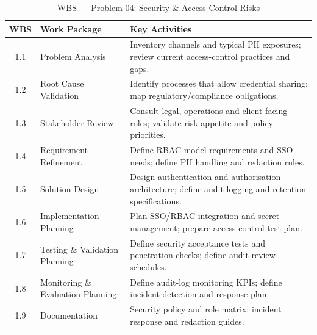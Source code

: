 \documentclass[12pt,a4paper]{report}
\begin{document}
\begin{table}[H]
\centering
\renewcommand{\arraystretch}{1.25}
\small
\begin{tabularx}{\textwidth}{|c|p{4.2cm}|X|}
\hline
\rowcolor{secondary}
\textbf{WBS} & \textbf{Work Package} & \textbf{Key Activities} \\
\hline
1.1 & Problem Analysis & Inventory channels and typical PII exposures; review current access-control practices and gaps. \\
\hline
1.2 & Root Cause Validation & Identify processes that allow credential sharing; map regulatory/compliance obligations. \\
\hline
1.3 & Stakeholder Review & Consult legal, operations and client-facing roles; validate risk appetite and policy priorities. \\
\hline
1.4 & Requirement Refinement & Define RBAC model requirements and SSO needs; define PII handling and redaction rules. \\
\hline
1.5 & Solution Design & Design authentication and authorisation architecture; define audit logging and retention specifications. \\
\hline
1.6 & Implementation Planning & Plan SSO/RBAC integration and secret management; prepare access-control test plan. \\
\hline
1.7 & Testing \& Validation Planning & Define security acceptance tests and penetration checks; define audit review schedules. \\
\hline
1.8 & Monitoring \& Evaluation Planning & Define audit-log monitoring KPIs; define incident detection and response plan. \\
\hline
1.9 & Documentation & Security policy and role matrix; incident response and redaction guides. \\
\hline
\end{tabularx}
\caption{WBS --- Problem 04: Security \& Access Control Risks}
\end{table}
\end{document}
